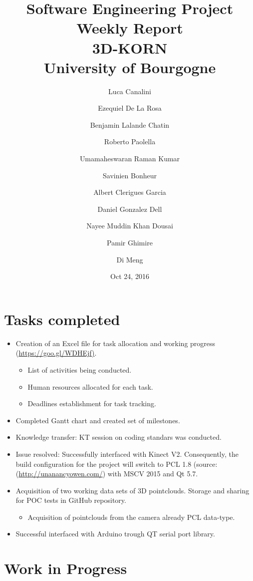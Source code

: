 \documentclass[11pt]{article} %
\title{Software Engineering Project Weekly Report\\ \textbf{3D-KORN} \\ University of Bourgogne}
\author{Luca Canalini \and Ezequiel De La Rosa \and Benjamin Lalande Chatin \and Roberto Paolella \and Umamaheswaran Raman Kumar \and Savinien Bonheur \and Albert Clerigues Garcia \and Daniel Gonzalez Dell \and Nayee Muddin Khan Dousai \and Pamir Ghimire \and Di Meng
}
\date{Oct 24, 2016} %
\begin{document}
\maketitle
\newpage

\section{Tasks completed}
\begin{itemize}
\item Creation of an Excel file for task allocation and working progress (\url{https://goo.gl/WDHEjf)}. %
\begin{itemize}
		\item List of activities being conducted. 
		\item Human resources allocated for each task.
		\item Deadlines establishment for task tracking.	\end{itemize}

\item Completed Gantt chart and created set of milestones.

	
\item Knowledge transfer: KT session on coding standars was conducted.

\item Issue resolved:  Successfully interfaced with Kinect V2. Consequently, the build configuration for the project will switch to PCL 1.8 (source: (\url{http://unanancyowen.com/}) with MSCV 2015 and Qt 5.7.  
			
\item Acquisition of two working data sets of 3D pointclouds. Storage and sharing for POC tests in GitHub repository.
	\begin{itemize}
		\item Acquisition of pointclouds from the camera already PCL data-type.
	\end{itemize}   

\item Successful interfaced with Arduino trough QT serial port library.


\end{itemize}

\section{Work in Progress}
\end{document}
